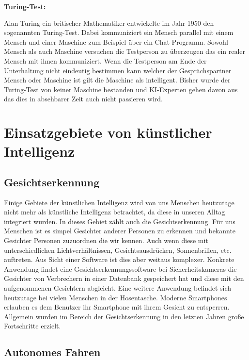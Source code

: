 \documentclass[oneside]{ausarbeitung}
\begin{document}
\textbf{Turing-Test:}

Alan Turing ein britischer Mathematiker entwickelte im Jahr 1950 den sogenannten Turing-Test. Dabei kommuniziert ein Mensch parallel mit einem Mensch und einer Maschine zum Beispiel über ein Chat Programm. Sowohl Mensch als auch Maschine versuchen die Testperson zu überzeugen das ein realer Mensch mit ihnen kommuniziert. Wenn die Testperson am Ende der Unterhaltung nicht eindeutig bestimmen kann welcher der Gesprächspartner Mensch oder Maschine ist gilt die Maschine als intelligent. Bisher wurde der Turing-Test von keiner Maschine bestanden und KI-Experten gehen davon aus das dies in absehbarer Zeit auch nicht passieren wird.

\pagebreak

\section{Einsatzgebiete von künstlicher Intelligenz}

\subsection{Gesichtserkennung}

Einige Gebiete der künstlichen Intelligenz wird von uns Menschen heutzutage nicht mehr als künstliche Intelligenz betrachtet, da diese in unseren Alltag integriert wurden. In dieses Gebiet zählt auch die Gesichtserkennung. Für uns Menschen ist es simpel Gesichter anderer Personen zu erkennen und bekannte Gesichter Personen zuzuordnen die wir kennen. Auch wenn diese mit unterschiedlichen Lichtverhältnissen, Gesichtsausdrücken, Sonnenbrillen, etc. auftreten. Aus Sicht einer Software ist dies aber weitaus komplexer. Konkrete Anwendung findet eine Gesichtserkennungssoftware bei Sicherheitskameras die Gesichter von Verbrechern in einer Datenbank gespeichert hat und diese mit den aufgenommenen Gesichtern abgleicht. Eine weitere Anwendung befindet sich heutzutage bei vielen Menschen in der Hosentasche. Moderne Smartphones erlauben es dem Benutzer ihr Smartphone mit ihrem Gesicht zu entsperren. Allgemein wurden im Bereich der Gesichtserkennung in den letzten Jahren große Fortschritte erzielt.

\subsection{Autonomes Fahren}
\end{document}
